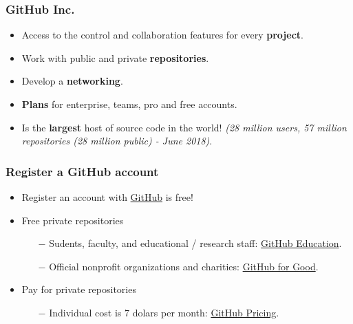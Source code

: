 \documentclass{beamer}
\begin{document}
\begin{frame}
\frametitle{GitHub Inc.}
\begin{itemize}
    \item Access to the control and collaboration features for every \textbf{project}. \hfill \break
    \item Work with public and private \textbf{repositories}. \hfill \break
    \item Develop a \textbf{networking}. \hfill \break
    \item \textbf{Plans} for enterprise, teams, pro and free accounts. \hfill \break
    \item Is the \textbf{largest} host of source code in the world! \emph{(28 million users, 57 million repositories (28 million public) - June 2018)}.
\end{itemize}
\end{frame}


\begin{frame}
\frametitle{Register a GitHub account}
\begin{itemize}
    \item Register an account with \href{https://github.com/}{\faStar GitHub} is free! \hfill \break
    \item Free private repositories
          \begin{itemize}
          \item[$-$] Sudents, faculty, and educational / research staff: \href{https://education.github.com/}{\faStar GitHub Education}.
          \item[$-$] Official nonprofit organizations and charities: \href{https://github.com/nonprofit}{\faStar GitHub for Good}.
          \hfill \break
          \end{itemize}
    \item Pay for private repositories
          \begin{itemize}
          \item[$-$] Individual cost is 7 dolars per month: \href{https://github.com/pricing}{\faStar GitHub Pricing}.
          \end{itemize}

\end{itemize}
\end{frame}
\end{document}
